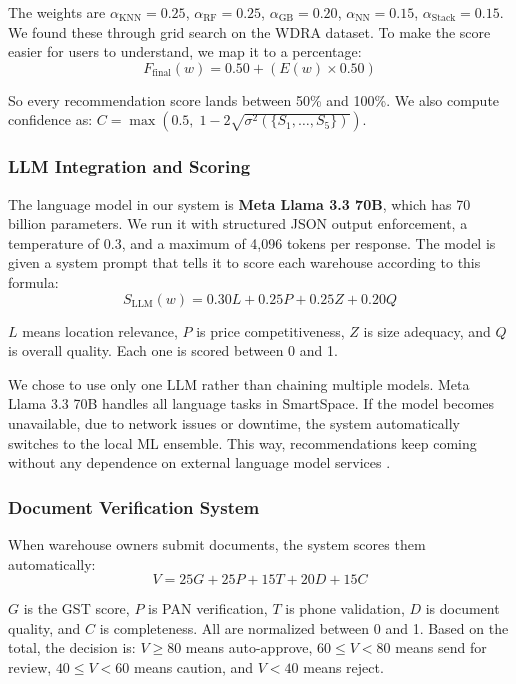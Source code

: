 \documentclass[conference]{IEEEtran}
\begin{document}
\noindent The weights are $\alpha_{\text{KNN}} = 0.25$, $\alpha_{\text{RF}} = 0.25$, $\alpha_{\text{GB}} = 0.20$, $\alpha_{\text{NN}} = 0.15$, $\alpha_{\text{Stack}} = 0.15$. We found these through grid search on the WDRA dataset. To make the score easier for users to understand, we map it to a percentage:
\begin{equation}
F_{\text{final}}(w) = 0.50 + \left(E(w) \times 0.50\right)
\label{eq:final}
\end{equation}

\noindent So every recommendation score lands between 50\% and 100\%. We also compute confidence as: $C = \max(0.5,\; 1 - 2\sqrt{\sigma^2(\{S_1, \ldots, S_5\})})$.

\subsubsection{LLM Integration and Scoring}
The language model in our system is \textbf{Meta Llama 3.3 70B}, which has 70 billion parameters. We run it with structured JSON output enforcement, a temperature of 0.3, and a maximum of 4,096 tokens per response. The model is given a system prompt that tells it to score each warehouse according to this formula:
\begin{equation}
S_{\text{LLM}}(w) = 0.30L + 0.25P + 0.25Z + 0.20Q
\label{eq:llm}
\end{equation}

\noindent $L$ means location relevance, $P$ is price competitiveness, $Z$ is size adequacy, and $Q$ is overall quality. Each one is scored between 0 and 1.

We chose to use only one LLM rather than chaining multiple models. Meta Llama 3.3 70B handles all language tasks in SmartSpace. If the model becomes unavailable, due to network issues or downtime, the system automatically switches to the local ML ensemble. This way, recommendations keep coming without any dependence on external language model services \cite{b7}.

\subsubsection{Document Verification System}
When warehouse owners submit documents, the system scores them automatically:
\begin{equation}
V = 25G + 25P + 15T + 20D + 15C
\label{eq:verify}
\end{equation}

\noindent $G$ is the GST score, $P$ is PAN verification, $T$ is phone validation, $D$ is document quality, and $C$ is completeness. All are normalized between 0 and 1. Based on the total, the decision is: $V \geq 80$ means auto-approve, $60 \leq V < 80$ means send for review, $40 \leq V < 60$ means caution, and $V < 40$ means reject.
\end{document}
